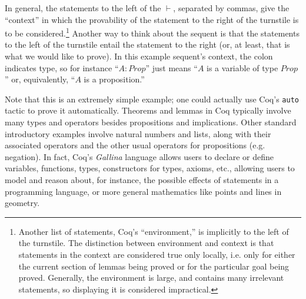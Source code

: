 \documentclass[11pt]{amsart}
\begin{document}
In general, the statements to the left of the $\vdash$, separated by commas, give the ``context'' in which the provability of the statement to the right of the turnstile is to be considered.\footnote{Another list of statements, Coq's ``environment,'' is implicitly to the left of the turnstile.  The distinction between environment and context is that statements in the context are considered true only locally, i.e. only for either the current section of lemmas being proved or for the particular goal being proved.  Generally, the environment is large, and contains many irrelevant statements, so displaying it is considered impractical.}  Another way to think about the sequent is that the statements to the left of the turnstile entail the statement to the right (or, at least, that is what we would like to prove).  In this example sequent's context, the colon indicates type, so for instance ``$A : Prop$'' just means ``$A$ is a variable of type $Prop$'' or, equivalently, ``$A$ is a proposition.''

Note that this is an extremely simple example; one could actually use Coq's \texttt{auto} tactic to prove it automatically.  Theorems and lemmas in Coq typically involve many types and operators besides propositions and implications.  Other standard introductory examples involve natural numbers and lists, along with their associated operators and the other usual operators for propositions (e.g. negation).  In fact, Coq's \textit{Gallina} language allows users to declare or define variables, functions, types, constructors for types, axioms, etc., allowing users to model and reason about, for instance, the possible effects of statements in a programming language, or more general mathematics like points and lines in geometry.
\end{document}
